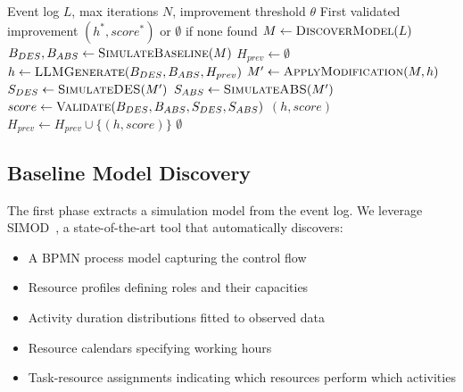 \documentclass[preprint,12pt]{elsarticle}
\begin{document}
\begin{algorithm}[t]
\caption{Improvement Validation Pipeline}
\label{alg:pipeline}
\begin{algorithmic}[1]
\REQUIRE Event log $L$, max iterations $N$, improvement threshold $\theta$
\ENSURE First validated improvement $(h^*, score^*)$ or $\emptyset$ if none found
\STATE $M \leftarrow \textsc{DiscoverModel}(L)$ 
\STATE $B_{DES}, B_{ABS} \leftarrow \textsc{SimulateBaseline}(M)$ 
\STATE $H_{prev} \leftarrow \emptyset$ 
    \STATE $h \leftarrow \textsc{LLMGenerate}(B_{DES}, B_{ABS}, H_{prev})$ 
    \STATE $M' \leftarrow \textsc{ApplyModification}(M, h)$ 
    \STATE $S_{DES} \leftarrow \textsc{SimulateDES}(M')$ 
    \STATE $S_{ABS} \leftarrow \textsc{SimulateABS}(M')$ 
    \STATE $score \leftarrow \textsc{Validate}(B_{DES}, B_{ABS}, S_{DES}, S_{ABS})$ 
        \RETURN $(h, score)$ 
    \ENDIF
    \STATE $H_{prev} \leftarrow H_{prev} \cup \{(h, score)\}$ 
\ENDFOR
\RETURN $\emptyset$ 
\end{algorithmic}
\end{algorithm}

\subsection{Baseline Model Discovery}

The first phase extracts a simulation model from the event log. We leverage SIMOD~\cite{camargo2020automated}, a state-of-the-art tool that automatically discovers:

\begin{itemize}
    \item A BPMN process model capturing the control flow
    \item Resource profiles defining roles and their capacities
    \item Activity duration distributions fitted to observed data
    \item Resource calendars specifying working hours
    \item Task-resource assignments indicating which resources perform which activities
\end{itemize}
\end{document}
